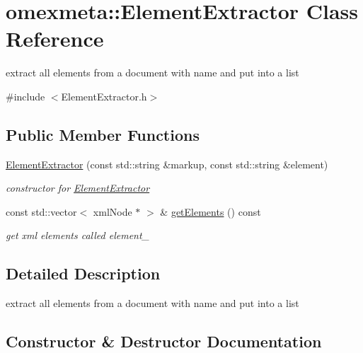 \hypertarget{classomexmeta_1_1ElementExtractor}{}\section{omexmeta\+:\+:Element\+Extractor Class Reference}
\label{classomexmeta_1_1ElementExtractor}


extract all elements from a document with name and put into a list  




{\ttfamily \#include $<$Element\+Extractor.\+h$>$}

\subsection*{Public Member Functions}
\begin{DoxyCompactItemize}
\item 
\hyperlink{classomexmeta_1_1ElementExtractor_a9de35d2d6cf78dad4fa9fb2f46fa8e37}{Element\+Extractor} (const std\+::string \&markup, const std\+::string \&element)
\begin{DoxyCompactList}\small\item\em constructor for \hyperlink{classomexmeta_1_1ElementExtractor}{Element\+Extractor} \end{DoxyCompactList}\item 
\mbox{\label{classomexmeta_1_1ElementExtractor_aedddcdb8149ac96e76f20ffd56980b0c}} 
const std\+::vector$<$ xml\+Node $\ast$ $>$ \& \hyperlink{classomexmeta_1_1ElementExtractor_aedddcdb8149ac96e76f20ffd56980b0c}{get\+Elements} () const
\begin{DoxyCompactList}\small\item\em get xml elements called element\+\_\+ \end{DoxyCompactList}\end{DoxyCompactItemize}


\subsection{Detailed Description}
extract all elements from a document with name and put into a list 

\subsection{Constructor \& Destructor Documentation}
\mbox{\label{classomexmeta_1_1ElementExtractor_a9de35d2d6cf78dad4fa9fb2f46fa8e37}} 
